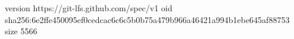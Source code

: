 version https://git-lfs.github.com/spec/v1
oid sha256:6e2ffe450095ef0cedcac6c6c5b0b75a479b966a46421a994b1ebe645af88753
size 5566
